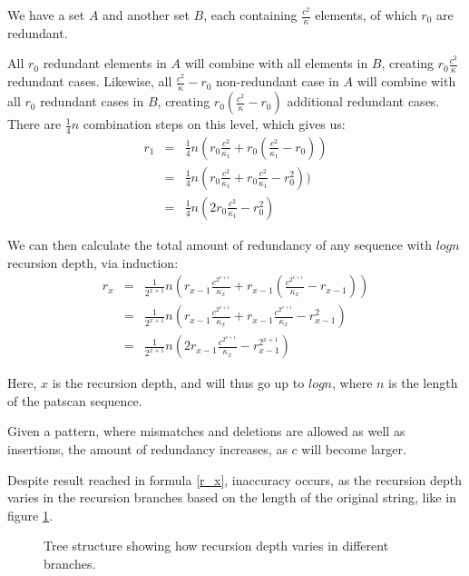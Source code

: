\documentclass[12pt]{article}
\theoremstyle{definition}
\begin{document}
\begin{example}
We have a set $A$ and another set $B$, each containing $\frac{c^2}{\kappa}$ elements, of which $r_0$ are redundant.

All $r_0$ redundant elements in $A$ will combine with all elements in $B$, creating $r_0\frac{c^2}{\kappa}$ redundant cases. Likewise, all $\frac{c^2}{\kappa}-r_0$ non-redundant case in $A$ will combine with all $r_0$ redundant cases in $B$, creating $r_0(\frac{c^2}{\kappa}-r_0)$ additional redundant cases. There are $\frac{1}{4}n$ combination steps on this level, which gives us:
\begin{eqnarray}
	r_1 &=& \frac{1}{4}n(r_0\frac{c^2}{\kappa_1} + r_0(\frac{c^2}{\kappa_1} - r_0))\\
		&=& \frac{1}{4}n(r_0\frac{c^2}{\kappa_1} + r_0\frac{c^2}{\kappa_1} - r_0^2))\\
		&=& \frac{1}{4}n(2r_0\frac{c^2}{\kappa_1} - r_0^2)
\end{eqnarray}
\end{example}

We can then calculate the total amount of redundancy of any sequence with $logn$ recursion depth, via induction:
\begin{eqnarray}
	r_x &=& \frac{1}{2^{x+1}}n (r_{x-1}\frac{c^{2^{x+1}}}{\kappa_x} + r_{x-1}(\frac{c^{2^{x+1}}}{\kappa_x} - r_{x-1}))\\
		&=& \frac{1}{2^{x+1}}n (r_{x-1}\frac{c^{2^{x+1}}}{\kappa_x} + r_{x-1}\frac{c^{2^{x+1}}}{\kappa_x} - r_{x-1}^2)\\
		\label{r_x}
		&=& \frac{1}{2^{x+1}}n (2r_{x-1}\frac{c^{2^{x+1}}}{\kappa_x} - r_{x-1}^{2^{x+1}})
\end{eqnarray}

Here, $x$ is the recursion depth, and will thus go up to $logn$, where $n$ is the length of the patscan sequence.

Given a pattern, where mismatches and deletions are allowed as well as insertions, the amount of redundancy increases, as $c$ will become larger.

Despite result reached in formula \ref{r_x}, inaccuracy occurs, as the recursion depth varies in the recursion branches based on the length of the original string, like in figure \ref{fig:recursion_depth_example}.

\begin{figure}[H]
	\centering
	\caption{Tree structure showing how recursion depth varies in different branches.}
	\label{fig:recursion_depth_example}
\end{figure}
\end{document}
